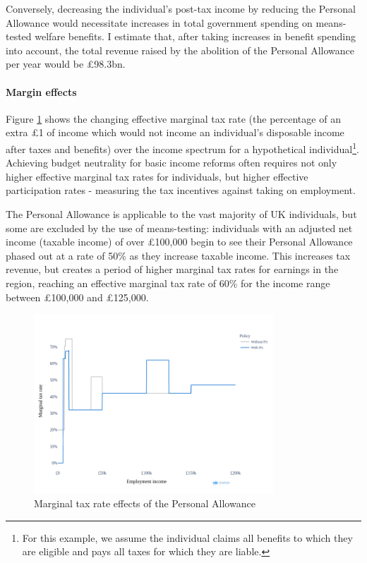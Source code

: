 \documentclass{article}
\begin{document}
    Conversely, decreasing the individual's post-tax income by reducing the Personal Allowance would necessitate increases in total government spending on means-tested welfare benefits. I estimate that, after taking increases in benefit spending into account, the total revenue raised by the abolition of the Personal Allowance per year would be £98.3bn.
    
    \paragraph{Margin effects} Figure \ref{fig:PA_mtr_effects} shows the changing effective marginal tax rate (the percentage of an extra £1 of income which would not income an individual's disposable income after taxes and benefits) over the income spectrum for a hypothetical individual\footnote{For this example, we assume the individual claims all benefits to which they are eligible and pays all taxes for which they are liable.}. Achieving budget neutrality for basic income reforms often requires not only higher effective marginal tax rates for individuals, but higher effective participation rates - measuring the tax incentives against taking on employment.\cite{work_incentives}
    
    The Personal Allowance is applicable to the vast majority of UK individuals, but some are excluded by the use of means-testing: individuals with an adjusted net income (taxable income) of over £100,000 begin to see their Personal Allowance phased out at a rate of 50\% as they increase taxable income. This increases tax revenue, but creates a period of higher marginal tax rates for earnings in the region, reaching an effective marginal tax rate of 60\% for the income range between £100,000 and £125,000.

    \begin{figure}
        \centering
        \includegraphics[width=0.8\textwidth]{images/fig_2.png}
        \caption{Marginal tax rate effects of the Personal Allowance}
        \label{fig:PA_mtr_effects}
    \end{figure}
    
\end{document}
